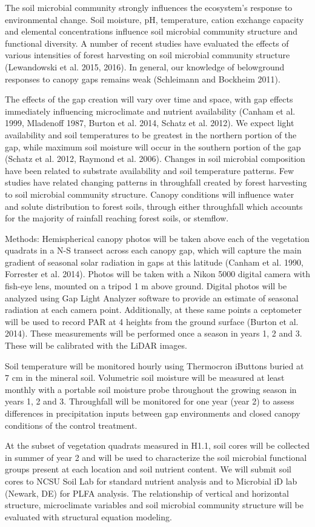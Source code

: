 \documentclass{article}\usepackage[]{graphicx}\usepackage[]{color}
\begin{document}
The soil microbial community strongly influences the ecosystem’s response to environmental change. Soil moisture, pH, temperature, cation exchange capacity and elemental concentrations influence soil microbial community structure and functional diversity. A number of recent studies have evaluated the effects of various intensities of forest harvesting on soil microbial community structure (Lewandowski et al. 2015, 2016). In general, our knowledge of belowground responses to canopy gaps remains weak (Schleimann and Bockheim 2011).

The effects of the gap creation will vary over time and space, with gap effects immediately influencing microclimate and nutrient availability (Canham et al. 1999, Mladenoff 1987, Burton et al. 2014, Schatz et al. 2012). We expect light availability and soil temperatures to be greatest in the northern portion of the gap, while maximum soil moisture will occur in the southern portion of the gap (Schatz et al. 2012, Raymond et al. 2006). Changes in soil microbial composition have been related to substrate availability and soil temperature patterns. Few studies have related changing patterns in throughfall created by forest harvesting to soil microbial community structure. Canopy conditions will influence water and solute distribution to forest soils, through either throughfall which accounts for the majority of rainfall reaching forest soils, or stemflow.

Methods: Hemispherical canopy photos will be taken above each of the vegetation quadrats in a N-S transect across each canopy gap, which will capture the main gradient of seasonal solar radiation in gaps at this latitude (Canham et al. 1990, Forrester et al. 2014). Photos will be taken with a Nikon 5000 digital camera with fish-eye lens, mounted on a tripod 1 m above ground. Digital photos will be analyzed using Gap Light Analyzer software to provide an estimate of seasonal radiation at each camera point. Additionally, at these same points a ceptometer will be used to record PAR at 4 heights from the ground surface (Burton et al. 2014). These measurements will be performed once a season in years 1, 2 and 3. These will be calibrated with the LiDAR images.

Soil temperature will be monitored hourly using Thermocron iButtons buried at 7 cm in the mineral soil. Volumetric soil moisture will be measured at least monthly with a portable soil moisture probe throughout the growing season in years 1, 2 and 3.  Throughfall will be monitored for one year (year 2) to assess differences in precipitation inputs between gap environments and closed canopy conditions of the control treatment.

At the subset of vegetation quadrats measured in H1.1, soil cores will be collected in summer of year 2 and will be used to characterize the soil microbial functional groups present at each location and soil nutrient content. We will submit soil cores to NCSU Soil Lab for standard nutrient analysis and to Microbial iD lab (Newark, DE) for PLFA analysis. The relationship of vertical and horizontal structure, microclimate variables and soil microbial community structure will be evaluated with structural equation modeling.


\end{document}
